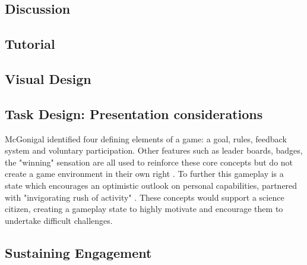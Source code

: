 \documentclass{sigchi}
\begin{document}


\subsection{Discussion}

\subsection{Tutorial}

\subsection{Visual Design}

\subsection{Task Design: Presentation considerations}
McGonigal identified four defining elements of a game: a goal, rules, feedback system and voluntary participation. Other features such as leader boards, badges, the "winning" sensation are all used to reinforce these core concepts but do not create a game environment in their own right \cite{mcgonigal2011reality}. To further this gameplay is a state which encourages an optimistic outlook on personal capabilities, partnered with "invigorating rush of activity" \cite{mcgonigal2011reality}. These concepts would support a science citizen, creating a gameplay state to highly motivate and encourage them to undertake difficult challenges. 

\subsection{Sustaining Engagement}

\end{document}
